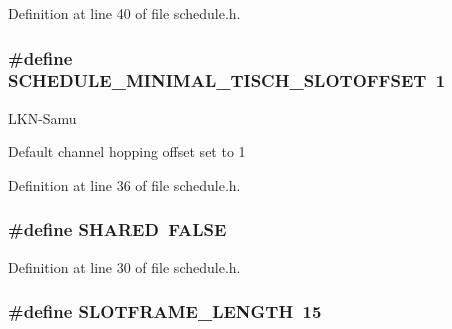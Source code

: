 Definition at line 40 of file schedule.\+h.

\subsubsection[{\texorpdfstring{S\+C\+H\+E\+D\+U\+L\+E\+\_\+\+M\+I\+N\+I\+M\+A\+L\+\_\+6\+T\+I\+S\+C\+H\+\_\+\+S\+L\+O\+T\+O\+F\+F\+S\+ET}{SCHEDULE_MINIMAL_6TISCH_SLOTOFFSET}}]{\setlength{\rightskip}{0pt plus 5cm}\#define S\+C\+H\+E\+D\+U\+L\+E\+\_\+\+M\+I\+N\+I\+M\+A\+L\+\_\+T\+I\+S\+C\+H\+\_\+\+S\+L\+O\+T\+O\+F\+F\+S\+ET~1}\hypertarget{group___schedule_ga62c64cb1c9bbbb2927f358c14535fb7f}{}\label{group___schedule_ga62c64cb1c9bbbb2927f358c14535fb7f}
\begin{DoxyRefDesc}{L\+K\+N-\/\+Samu}
\item[\hyperlink{_l_k_n_code_edits__LKN_code_edits000009}{L\+K\+N-\/\+Samu}]Default channel hopping offset set to 1 \end{DoxyRefDesc}


Definition at line 36 of file schedule.\+h.

\subsubsection[{\texorpdfstring{S\+H\+A\+R\+ED}{SHARED}}]{\setlength{\rightskip}{0pt plus 5cm}\#define S\+H\+A\+R\+ED~{\bf F\+A\+L\+SE}}\hypertarget{group___schedule_ga884c794595c4aa480df9022648c29564}{}\label{group___schedule_ga884c794595c4aa480df9022648c29564}


Definition at line 30 of file schedule.\+h.

\subsubsection[{\texorpdfstring{S\+L\+O\+T\+F\+R\+A\+M\+E\+\_\+\+L\+E\+N\+G\+TH}{SLOTFRAME_LENGTH}}]{\setlength{\rightskip}{0pt plus 5cm}\#define S\+L\+O\+T\+F\+R\+A\+M\+E\+\_\+\+L\+E\+N\+G\+TH~15}\hypertarget{group___schedule_gaea12b586ec3f6de3ffcfff93da574345}{}\label{group___schedule_gaea12b586ec3f6de3ffcfff93da574345}


